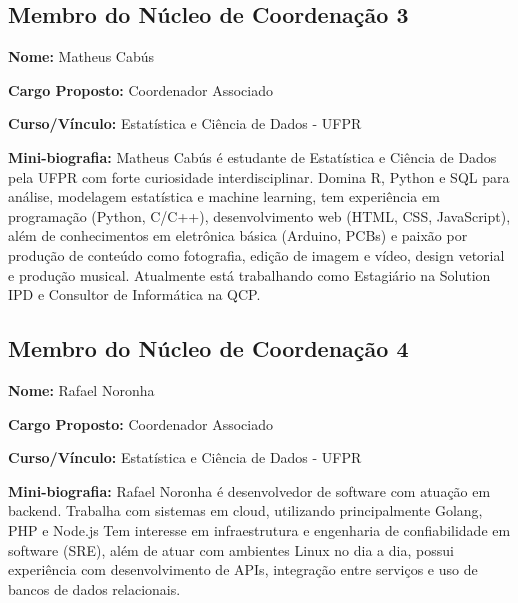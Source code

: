 \documentclass[11pt,a4paper]{article}
\begin{document}
\subsection{Membro do Núcleo de Coordenação 3}

\textbf{Nome:} Matheus Cabús

\textbf{Cargo Proposto:} Coordenador Associado

\textbf{Curso/Vínculo:} Estatística e Ciência de Dados - UFPR

\textbf{Mini-biografia:}  
Matheus Cabús é estudante de Estatística e Ciência de Dados pela UFPR com forte curiosidade interdisciplinar. Domina R, Python e SQL para análise, modelagem estatística e machine learning, tem experiência em programação (Python, C/C++), desenvolvimento web (HTML, CSS, JavaScript), além de conhecimentos em eletrônica básica (Arduino, PCBs) e paixão por produção de conteúdo como fotografia, edição de imagem e vídeo, design vetorial e produção musical. Atualmente está trabalhando como Estagiário na Solution IPD e Consultor de Informática na QCP.
\vspace{1em}

\subsection{Membro do Núcleo de Coordenação 4}

\textbf{Nome:} Rafael Noronha

\textbf{Cargo Proposto:} Coordenador Associado

\textbf{Curso/Vínculo:} Estatística e Ciência de Dados - UFPR

\textbf{Mini-biografia:}  
Rafael Noronha é desenvolvedor de software com atuação em backend. Trabalha com sistemas em cloud, utilizando principalmente Golang, PHP e Node.js Tem interesse em infraestrutura e engenharia de confiabilidade em software (SRE), além de atuar com ambientes Linux no dia a dia, possui experiência com desenvolvimento de APIs, integração entre serviços e uso de bancos de dados relacionais.

\vspace{1em}
\end{document}
